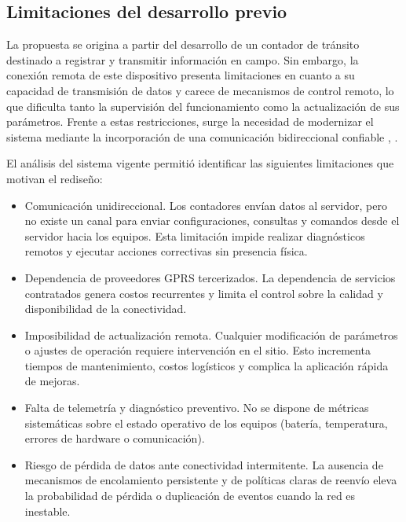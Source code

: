 \subsection{Limitaciones del desarrollo previo}
La propuesta se origina a partir del desarrollo de un contador de tránsito destinado a registrar y transmitir información en campo. Sin embargo, la conexión remota de este dispositivo presenta limitaciones en cuanto a su capacidad de transmisión de datos y carece de mecanismos de control remoto, lo que dificulta tanto la supervisión del funcionamiento como la actualización de sus parámetros. Frente a estas restricciones, surge la necesidad de modernizar el sistema mediante la incorporación de una comunicación bidireccional confiable \cite{peruzzi2022lorawan}, \cite{micko2023iot}. 

El análisis del sistema vigente permitió identificar las siguientes limitaciones que motivan el rediseño:

\begin{itemize}
\item  Comunicación unidireccional. Los contadores envían datos al servidor, pero no existe un canal para enviar configuraciones, consultas y comandos desde el servidor hacia los equipos. Esta limitación impide realizar diagnósticos remotos y ejecutar acciones correctivas sin presencia física.

\item  Dependencia de proveedores GPRS tercerizados. La dependencia de servicios contratados genera costos recurrentes y limita el control sobre la calidad y disponibilidad de la conectividad.

\item  Imposibilidad de actualización remota. Cualquier modificación de parámetros o ajustes de operación requiere intervención en el sitio. Esto incrementa tiempos de mantenimiento, costos logísticos y complica la aplicación rápida de mejoras.

\item  Falta de telemetría y diagnóstico preventivo. No se dispone de métricas sistemáticas sobre el estado operativo de los equipos (batería, temperatura, errores de hardware o comunicación).

\item Riesgo de pérdida de datos ante conectividad intermitente. La ausencia de mecanismos de encolamiento persistente y de políticas claras de reenvío eleva la probabilidad de pérdida o duplicación de eventos cuando la red es inestable.

\end{itemize}

